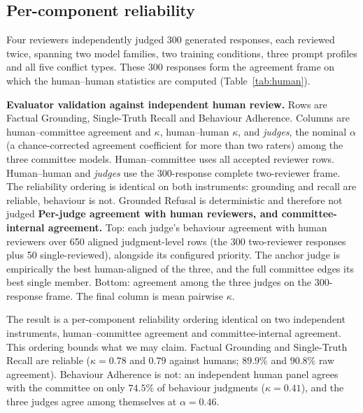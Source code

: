 \subsection{Per-component reliability}

Four reviewers independently judged 300 generated responses, each reviewed twice,
spanning two model families, two training conditions, three prompt profiles and
all five conflict types. These 300 responses form the agreement frame on which
the human--human statistics are computed (Table~\ref{tab:human}).

\begin{table}[htbp]
\centering
\begin{minipage}[t]{0.47\linewidth}\vspace{0pt}
\centering

\end{minipage}%
\hspace{0.03\linewidth}%
\begin{minipage}[t]{0.47\linewidth}\vspace{0pt}
\centering

\end{minipage}
%
{\textbf{Evaluator validation against independent human review.} Rows are Factual Grounding, Single-Truth Recall and Behaviour Adherence. Columns are human--committee agreement and $\kappa$, human--human $\kappa$, and \emph{judges}, the nominal $\alpha$ (a chance-corrected agreement coefficient for more than two raters) among the three committee models. Human--committee uses all accepted reviewer rows. Human--human and \emph{judges} use the 300-response complete two-reviewer frame. The reliability ordering is identical on both instruments: grounding and recall are reliable, behaviour is not. Grounded Refusal is deterministic and therefore not judged}%
{\textbf{Per-judge agreement with human reviewers, and committee-internal agreement.} Top: each judge's behaviour agreement with human reviewers over 650 aligned judgment-level rows (the 300 two-reviewer responses plus 50 single-reviewed), alongside its configured priority. The anchor judge is empirically the best human-aligned of the three, and the full committee edges its best single member. Bottom: agreement among the three judges on the 300-response frame. The final column is mean pairwise $\kappa$.}
\end{table}

The result is a per-component reliability ordering identical on two independent
instruments, human--committee agreement and committee-internal agreement. This ordering
bounds what we may claim. Factual Grounding and Single-Truth Recall are reliable
($\kappa=0.78$ and $0.79$ against humans; $89.9\%$ and $90.8\%$ raw agreement).
Behaviour Adherence is not: an independent human panel agrees with the committee
on only $74.5\%$ of behaviour judgments ($\kappa=0.41$), and the three judges
agree among themselves at $\alpha=0.46$.

